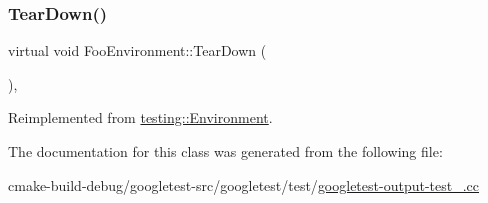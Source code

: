 \mbox{\label{classFooEnvironment_a99a2c9df52106cce9e7a4bdda53df802}} 
\subsubsection{\texorpdfstring{TearDown()}{TearDown()}}
{\footnotesize\ttfamily virtual void Foo\+Environment\+::\+Tear\+Down (\begin{DoxyParamCaption}{ }\end{DoxyParamCaption})\hspace{0.3cm}{\ttfamily [inline]}, {\ttfamily [virtual]}}



Reimplemented from \mbox{\hyperlink{classtesting_1_1Environment_a039bdaa705c46b9b88234cf4d3bb6254}{testing\+::\+Environment}}.



The documentation for this class was generated from the following file\+:\begin{DoxyCompactItemize}
\item 
cmake-\/build-\/debug/googletest-\/src/googletest/test/\mbox{\hyperlink{googletest-output-test___8cc}{googletest-\/output-\/test\+\_\+.\+cc}}\end{DoxyCompactItemize}
